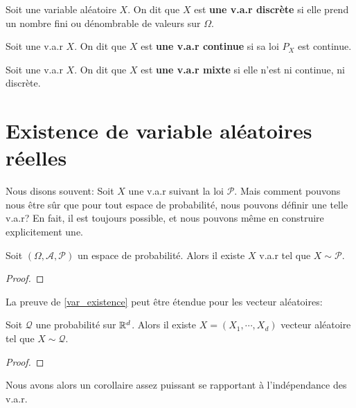 \begin{definition}
	Soit une variable aléatoire $X$. On dit que $X$ est \textbf{une v.a.r
	discrète} si elle prend un nombre fini ou dénombrable de valeurs sur
	$\Omega$.
\end{definition}

\begin{definition}
	Soit une v.a.r $X$. On dit que $X$ est \textbf{une v.a.r continue} si sa loi
	$P_{X}$ est continue.
\end{definition}

\begin{definition}
	Soit une v.a.r $X$. On dit que $X$ est \textbf{une v.a.r mixte} si elle
	n'est ni continue, ni discrète.
\end{definition}


\section{Existence de variable aléatoires réelles}

Nous disons souvent: Soit $X$ une v.a.r suivant la loi $\mathcal{P}$. Mais
comment pouvons nous être sûr que pour tout espace de probabilité, nous pouvons
définir une telle v.a.r? En fait, il est toujours possible, et nous pouvons même
en construire explicitement une.

\begin{proposition}
	\label{var_existence}
	Soit $(\Omega, \mathcal{A}, \mathcal{P})$ un espace de probabilité. Alors il
	existe $X$ v.a.r tel que $X \sim \mathcal{P}$.
\end{proposition}

\begin{proof}
	
\end{proof}

La preuve de \ref{var_existence} peut être étendue pour les vecteur aléatoires:

\begin{proposition}
	Soit $\mathcal{Q}$ une probabilité sur $\mathbb{R}^{d}$. Alors il existe
	$X = (X_{1}, \cdots, X_{d})$ vecteur aléatoire tel que $X \sim \mathcal{Q}$.
\end{proposition}

\begin{proof}
	
\end{proof}

Nous avons alors un corollaire assez puissant se rapportant à l'indépendance des
v.a.r.

